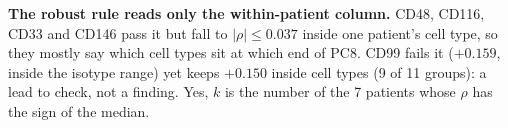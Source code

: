 
\begin{coreanswer}
\textbf{The robust rule reads only the within-patient column.} CD48, CD116, CD33 and CD146 pass it but fall to $|\rho| \leq 0.037$ inside one patient's cell type, so they mostly say which cell types sit at which end of PC8. CD99 fails it ($+0.159$, inside the isotype range) yet keeps $+0.150$ inside cell types (9 of 11 groups): a lead to check, not a finding. Yes, $k$ is the number of the 7 patients whose $\rho$ has the sign of the median.
\end{coreanswer}

